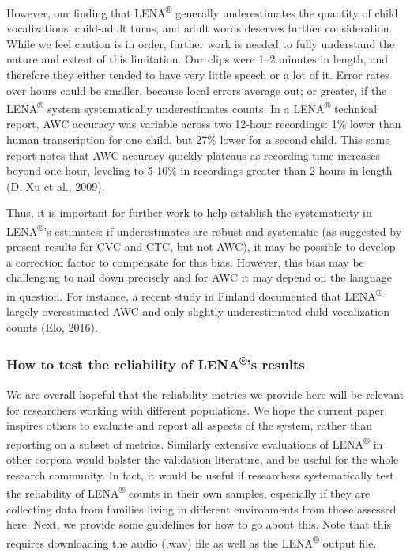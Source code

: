 \documentclass[english,table,man,floatsintext]{apa6}
\begin{document}
However, our finding that LENA\textsuperscript{®} generally underestimates the quantity of child vocalizations, child-adult turns, and adult words deserves further consideration. While we feel caution is in order, further work is needed to fully understand the nature and extent of this limitation. Our clips were 1--2 minutes in length, and therefore they either tended to have very little speech or a lot of it. Error rates over hours could be smaller, because local errors average out; or greater, if the LENA\textsuperscript{®} system systematically underestimates counts. In a LENA\textsuperscript{®} technical report, AWC accuracy was variable across two 12-hour recordings: 1\% lower than human transcription for one child, but 27\% lower for a second child. This same report notes that AWC accuracy quickly plateaus as recording time increases beyond one hour, leveling to 5-10\% in recordings greater than 2 hours in length (D. Xu et al., 2009).

Thus, it is important for further work to help establish the systematicity in LENA\textsuperscript{®}'s estimates: if underestimates are robust and systematic (as suggested by present results for CVC and CTC, but not AWC), it may be possible to develop a correction factor to compensate for this bias. However, this bias may be challenging to nail down precisely and for AWC it may depend on the language in question. For instance, a recent study in Finland documented that LENA\textsuperscript{®} largely overestimated AWC and only slightly underestimated child vocalization counts (Elo, 2016).

\hypertarget{how-to-test-the-reliability-of-lenas-results}{%
\subsubsection{\texorpdfstring{How to test the reliability of LENA\textsuperscript{®}'s results}{How to test the reliability of LENA®'s results}}\label{how-to-test-the-reliability-of-lenas-results}}

We are overall hopeful that the reliability metrics we provide here will be relevant for researchers working with different populations. We hope the current paper inspires others to evaluate and report all aspects of the system, rather than reporting on a subset of metrics. Similarly extensive evaluations of LENA\textsuperscript{®} in other corpora would bolster the validation literature, and be useful for the whole research community. In fact, it would be useful if researchers systematically test the reliability of LENA\textsuperscript{®} counts in their own samples, especially if they are collecting data from families living in different environments from those assessed here. Next, we provide some guidelines for how to go about this. Note that this requires downloading the audio (.wav) file as well as the LENA\textsuperscript{®} output file.
\end{document}
